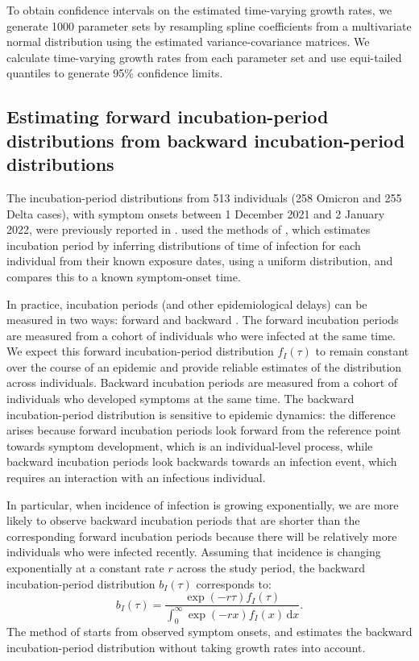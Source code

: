 \documentclass[12pt]{article}
\newcommand{\dd}[1]{\ensuremath{\, \mathrm{d}#1}}
\newcommand{\dx}{\dd{x}}
\begin{document}
To obtain confidence intervals on the estimated time-varying growth rates, we generate 1000 parameter sets by resampling spline coefficients from a multivariate normal distribution using the estimated variance-covariance matrices.
We calculate time-varying growth rates from each parameter set and use equi-tailed quantiles to generate 95\% confidence limits. 

\subsection{Estimating forward incubation-period distributions from backward incubation-period distributions}

The incubation-period distributions from 513 individuals (258 Omicron and 255 Delta cases), with symptom onsets between 1 December 2021 and 2 January 2022, were previously reported in \cite{backer2021omicron}.
\cite{backer2021omicron} used the methods of \cite{backer2020incubation}, which estimates incubation period by inferring distributions of time of infection for each individual from their known exposure dates, using a uniform distribution, and compares this to a known symptom-onset time.

In practice, incubation periods (and other epidemiological delays) can be measured in two ways: forward and backward \citep{park2021forward}.
The forward incubation periods are measured from a cohort of individuals who were infected at the same time. 
We expect this forward incubation-period distribution $f_I(\tau)$ to remain constant over the course of an epidemic and provide reliable estimates of the distribution across individuals. 
Backward incubation periods are measured from a cohort of individuals who developed symptoms at the same time. 
The backward incubation-period distribution is sensitive to epidemic dynamics:
the difference arises because forward incubation periods look forward from the reference point towards symptom development, which is an individual-level process, while backward incubation periods look backwards towards an infection event, which requires an interaction with an infectious individual.

In particular, when incidence of infection is growing exponentially, we are more likely to observe backward incubation periods that are shorter than the corresponding forward incubation periods because there will be relatively more individuals who were infected recently.
Assuming that incidence is changing exponentially at a constant rate $r$ across the study period, the backward incubation-period distribution $b_I(\tau)$ corresponds to:
\begin{equation}
b_I(\tau) =\frac{ \exp(-r\tau) f_I(\tau)}{\int_0^\infty \exp(-r x) f_I(x)  \dx}.
\label{eq:backward}
\end{equation}
The method of \cite{backer2020incubation} starts from observed symptom onsets, and estimates the backward incubation-period distribution without taking growth rates into account.
\end{document}
